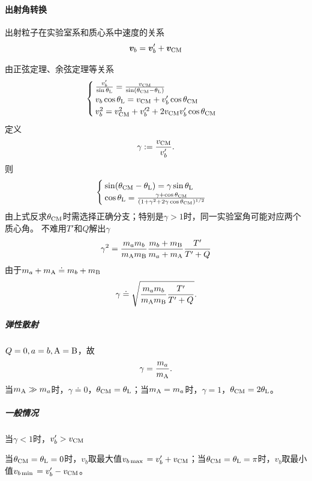\paragraph{出射角转换}
出射粒子在实验室系和质心系中速度的关系
\[
	\bm v_b = \bm v'_b + \bm v_{\mathrm{CM}}
\]
\begin{notecaptionblock}
\end{notecaptionblock}
由正弦定理、余弦定理等关系
\[
	\begin{cases}
		\frac{v_b'}{\sin\theta_\mathrm L} = \frac{v_{\mathrm{CM}}}{\sin(\theta_{\mathrm{CM}} - \theta_\mathrm L)}\\
		v_b\cos\theta_\mathrm L = v_{\mathrm{CM}} + v_b'\cos\theta_{\mathrm{CM}}\\
		v_b^2 = v_{\mathrm{CM}}^2 + v_b'^2 + 2v_{\mathrm{CM}} v_b'\cos\theta_{\mathrm{CM}}
	\end{cases}
\]
定义
\begin{align}
	\gamma := \frac{v_{\mathrm{CM}}}{v_b'}.
\end{align}
则
\begin{align}
	\begin{cases}
		\sin(\theta_{\mathrm{CM}} - \theta_\mathrm L) = \gamma\sin\theta_\mathrm L\\
		\cos\theta_\mathrm L = \frac{\gamma + \cos\theta_{\mathrm{CM}}}{(1 + \gamma^2 + 2\gamma\cos\theta_{\mathrm{CM}})^{1/2}}
	\end{cases}
\end{align}
由上式反求$\theta_{\mathrm{CM}}$时需选择正确分支；特别是$\gamma > 1$时，同一实验室角可能对应两个质心角。
不难用$T'$和$Q$解出$\gamma$
\[
	\gamma^2 = \frac{m_am_b}{m_{\mathrm{A}}m_{\mathrm{B}}}\frac{m_b + m_{\mathrm{B}}}{m_a + m_{\mathrm{A}}}\frac{T'}{T' + Q}
\]
由于$m_a + m_{\mathrm{A}} \doteq m_b + m_{\mathrm{B}}$
\begin{align}
	\gamma \doteq \sqrt{\frac{m_am_b}{m_{\mathrm{A}}m_{\mathrm{B}}}\frac{T'}{T' + Q}}.
\end{align}
\subparagraph{弹性散射}$Q = 0,a = b,\mathrm{A} = \mathrm{B}$，故
\[
	\gamma = \frac{m_a}{m_{\mathrm{A}}}.
\]
当$m_{\mathrm{A}} \gg m_a$时，$\gamma \doteq 0$，$\theta_{\mathrm{CM}} = \theta_\mathrm L$；当$m_{\mathrm{A}} = m_a$时，$\gamma = 1$，$\theta_{\mathrm{CM}} = 2\theta_\mathrm L$。
\subparagraph{一般情况}当$\gamma < 1$时，$v_b' > v_{\mathrm{CM}}$

当$\theta_{\mathrm{CM}} = \theta_\mathrm L = 0$时，$v_b$取最大值$v_{b\max{}} = v_b' + v_{\mathrm{CM}}$；当$\theta_{\mathrm{CM}} = \theta_\mathrm L = \pi$时，$v_b$取最小值$v_{b\min{}} = v_b' - v_{\mathrm{CM}}$。
\begin{notecaptionblock}
\end{notecaptionblock}

